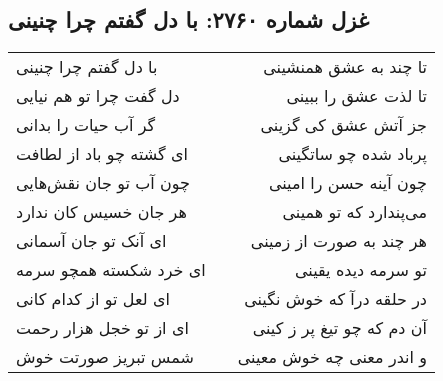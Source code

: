 \begin{center}
\section*{غزل شماره ۲۷۶۰: با دل گفتم چرا چنینی}
\label{sec:2760}
\begin{longtable}{l p{0.5cm} r}
با دل گفتم چرا چنینی
&&
تا چند به عشق همنشینی
\\
دل گفت چرا تو هم نیایی
&&
تا لذت عشق را ببینی
\\
گر آب حیات را بدانی
&&
جز آتش عشق کی گزینی
\\
ای گشته چو باد از لطافت
&&
پرباد شده چو ساتگینی
\\
چون آب تو جان نقش‌هایی
&&
چون آینه حسن را امینی
\\
هر جان خسیس کان ندارد
&&
می‌پندارد که تو همینی
\\
ای آنک تو جان آسمانی
&&
هر چند به صورت از زمینی
\\
ای خرد شکسته همچو سرمه
&&
تو سرمه دیده یقینی
\\
ای لعل تو از کدام کانی
&&
در حلقه درآ که خوش نگینی
\\
ای از تو خجل هزار رحمت
&&
آن دم که چو تیغ پر ز کینی
\\
شمس تبریز صورتت خوش
&&
و اندر معنی چه خوش معینی
\\
\end{longtable}
\end{center}
